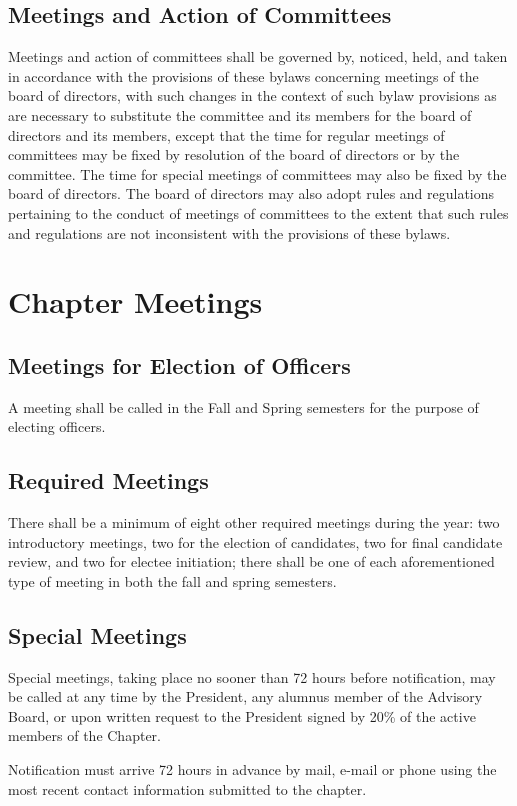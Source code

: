\documentclass{article}
\begin{document}
	\subsection{Meetings and Action of Committees}
	Meetings and action of committees shall be governed by, noticed, held, and taken in accordance with the provisions of these bylaws concerning meetings of the board of directors, with such changes in the context of such bylaw provisions as are necessary to substitute the committee and its members for the board of directors and its members, except that the time for regular meetings of committees may be fixed by resolution of the board of directors or by the committee. The time for special meetings of committees may also be fixed by the board of directors. The board of directors may also adopt rules and regulations pertaining to the conduct of meetings of committees to the extent that such rules and regulations are not inconsistent with the provisions of these bylaws.
	
	\section{Chapter Meetings}
	\subsection{Meetings for Election of Officers}
	A meeting shall be called in the Fall and Spring semesters for the purpose of electing officers.
	
	\subsection{Required Meetings}
	There shall be a minimum of eight other required meetings during the year: two introductory meetings, two for the election of candidates, two for final candidate review, and two for electee initiation; there shall be one of each aforementioned type of meeting in both the fall and spring semesters.
	
	\subsection{Special Meetings}
	Special meetings, taking place no sooner than 72 hours before notification, may be called at any time by the President, any alumnus member of the Advisory Board, or upon written request to the President signed by 20\% of the active members of the Chapter.
	
	Notification must arrive 72 hours in advance by mail, e-mail or phone using the most recent contact information submitted to the chapter.
	
\end{document}
